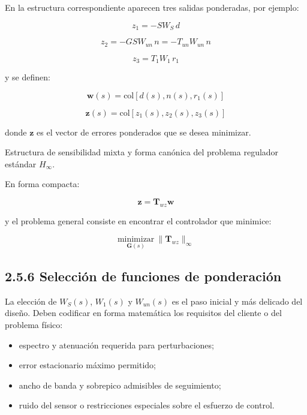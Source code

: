 En la estructura correspondiente aparecen tres salidas ponderadas, por ejemplo:

$$
z_1=-S W_S\,d
$$

$$
z_2=-G S W_{un}\,n=-T_{un}W_{un}\,n
$$

\[
z_3=T_1 W_1\,r_1 \tag{2.5.23}
\]

y se definen:

$$
\mathbf{w}(s)=\text{col}[d(s),n(s),r_1(s)]
$$

$$
\mathbf{z}(s)=\text{col}[z_1(s),z_2(s),z_3(s)]
$$

donde \(\mathbf{z}\) es el vector de errores ponderados que se desea minimizar.

\begin{images}[\label{img:sensibilidad-mixta-regulador}]{Estructura de sensibilidad mixta y forma canónica del problema regulador estándar \(H_\infty\).}
  \imagesnewline
\end{images}

En forma compacta:

\[
\mathbf{z}=\mathbf{T}_{wz}\mathbf{w} \tag{2.5.28}
\]

y el problema general consiste en encontrar el controlador que minimice:

\[
\underset{\mathbf{G}(s)}{\text{minimizar}}\ \|\mathbf{T}_{wz}\|_\infty \tag{2.5.29}
\]

\subsection{2.5.6 Selección de funciones de ponderación}
La elección de \(W_S(s)\), \(W_1(s)\) y \(W_{un}(s)\) es el paso inicial y más delicado del diseño. Deben codificar en forma matemática los requisitos del cliente o del problema físico:

\begin{itemize}
  \item espectro y atenuación requerida para perturbaciones;
  \item error estacionario máximo permitido;
  \item ancho de banda y sobrepico admisibles de seguimiento;
  \item ruido del sensor o restricciones especiales sobre el esfuerzo de control.
\end{itemize}

